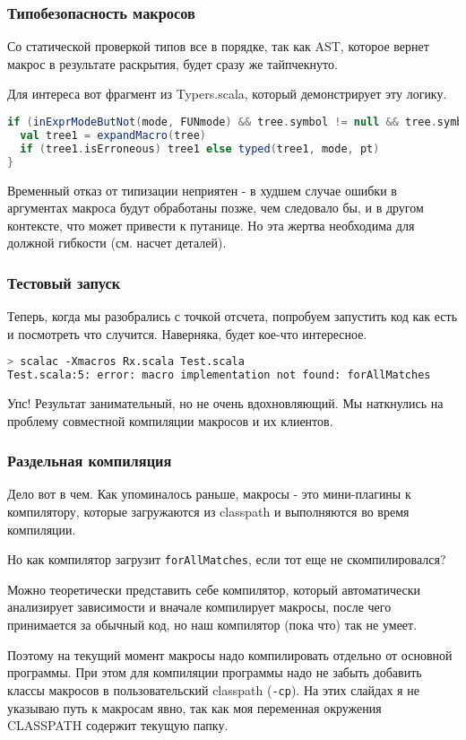 \documentclass[hyperref={bookmarks=false}]{beamer}
\begin{document}
\begin{frame}[t,fragile]
\frametitle{Типобезопасность макросов}

Со статической проверкой типов все в порядке, так как AST, которое вернет макрос в результате раскрытия, будет сразу же тайпчекнуто.

Для интереса вот фрагмент из Typers.scala, который демонстрирует эту логику.
\begin{lstlisting}[language=scala]
if (inExprModeButNot(mode, FUNmode) && tree.symbol != null && tree.symbol.isMacro && !tree.isDef) {
  val tree1 = expandMacro(tree)
  if (tree1.isErroneous) tree1 else typed(tree1, mode, pt)
}
\end{lstlisting}

Временный отказ от типизации неприятен - в худшем случае ошибки в аргументах макроса будут обработаны позже, чем следовало бы, и в другом контексте, что может привести к путанице. Но эта жертва необходима для должной гибкости (см.  насчет деталей).
\end{frame}

\begin{frame}[t,fragile]
\frametitle{Тестовый запуск}
Теперь, когда мы разобрались с точкой отсчета, попробуем запустить код как есть и посмотреть что случится. Наверняка, будет кое-что интересное.

\begin{lstlisting}[language=bash]
> scalac -Xmacros Rx.scala Test.scala
Test.scala:5: error: macro implementation not found: forAllMatches
\end{lstlisting}

Упс! Результат занимательный, но не очень вдохновляющий. Мы наткнулись на проблему совместной компиляции макросов и их клиентов.
\end{frame}

\begin{frame}[t,fragile]
\frametitle{Раздельная компиляция}
Дело вот в чем. Как упоминалось раньше, макросы - это мини-плагины к компилятору, которые загружаются из classpath и выполняются во время компиляции.

Но как компилятор загрузит \texttt{forAllMatches}, если тот еще не скомпилировался?

Можно теоретически представить себе компилятор, который автоматически анализирует зависимости и вначале компилирует макросы, после чего принимается за обычный код, но наш компилятор (пока что) так не умеет.

Поэтому на текущий момент макросы надо компилировать отдельно от основной программы. При этом для компиляции программы надо не забыть добавить классы макросов в пользовательский classpath (\texttt{-cp}). На этих слайдах я не указываю путь к макросам явно, так как моя переменная окружения CLASSPATH содержит текущую папку.
\end{frame}
\end{document}
